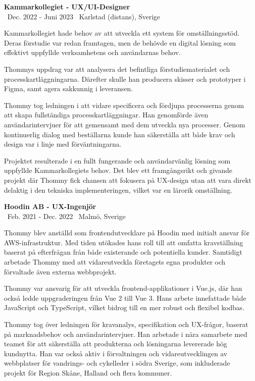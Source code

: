 \documentclass[a4paper,10pt]{article}
\begin{document}
\vspace{0.5cm}
\textbf{Kammarkollegiet - UX/UI-Designer}\\
\normalsize \faCalendar \ Dec. 2022 - Juni 2023 \quad \faMapMarker \ Karlstad (distans), Sverige

Kammarkollegiet hade behov av att utveckla ett system för omställningsstöd. Deras förstudie var redan framtagen, men de behövde en digital lösning som effektivt uppfyllde verksamhetens och användarnas behov.

Thommys uppdrag var att analysera det befintliga förstudiematerialet och processkartläggningarna. Därefter skulle han producera skisser och prototyper i Figma, samt agera sakkunnig i leveransen.

Thommy tog ledningen i att vidare specificera och fördjupa processerna genom att skapa fullständiga processkartläggningar. Han genomförde även användarintervjuer för att gemensamt med dem utveckla nya processer. Genom kontinuerlig dialog med beställarna kunde han säkerställa att både krav och design var i linje med förväntningarna.

Projektet resulterade i en fullt fungerande och användarvänlig lösning som uppfyllde Kammarkollegiets behov. Det blev ett framgångsrikt och givande projekt där Thommy fick chansen att fokusera på UX-design utan att vara direkt delaktig i den tekniska implementeringen, vilket var en lärorik omställning.

\vspace{0.5cm}
\textbf{Hoodin AB - UX-Ingenjör}\\
\normalsize \faCalendar \ Feb. 2021 - Dec. 2022 \quad \faMapMarker \ Malmö, Sverige

Thommy blev anställd som frontendutvecklare på Hoodin med initialt ansvar för AWS-infrastruktur. Med tiden utökades hans roll till att omfatta kravställning baserat på efterfrågan från både existerande och potentiella kunder. Samtidigt arbetade Thommy med att vidareutveckla företagets egna produkter och förvaltade även externa webbprojekt.

Thommy var ansvarig för att utveckla frontend-applikationer i Vue.js, där han också ledde uppgraderingen från Vue 2 till Vue 3. Hans arbete innefattade både JavaScript och TypeScript, vilket bidrog till en mer robust och flexibel kodbas.

Thommy tog över ledningen för kravanalys, specifikation och UX-frågor, baserat på marknadsbehov och användarintervjuer. Han arbetade i nära samarbete med teamet för att säkerställa att produkterna och lösningarna levererade hög kundnytta. Han var också aktiv i förvaltningen och vidareutvecklingen av webbplatser för vandrings- och cykelleder i södra Sverige, som inkluderade projekt för Region Skåne, Halland och flera kommuner.
\end{document}
